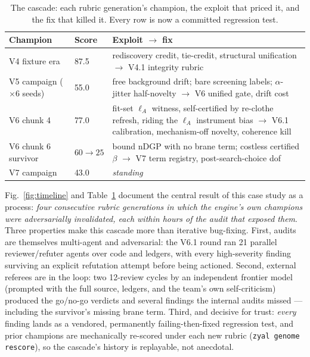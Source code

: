 \documentclass[journal]{IEEEtran}
\newcommand{\lA}{\ell_A}
\begin{document}
\begin{table}[t]
\caption{The cascade: each rubric generation's champion, the exploit that priced it, and
the fix that killed it. Every row is now a committed regression test.}
\label{tab:cascade}
\centering\footnotesize
\begin{tabular}{@{}llp{3.6cm}@{}}
\toprule
\textbf{Champion} & \textbf{Score} & \textbf{Exploit $\rightarrow$ fix} \\
\midrule
V4 fixture era & 87.5 & rediscovery credit, tie-credit, structural unification
$\rightarrow$ V4.1 integrity rubric \\
V5 campaign ($\times 6$ seeds) & 55.0 & free background drift; bare screening labels;
$\alpha$-jitter half-novelty $\rightarrow$ V6 unified gate, drift cost \\
V6 chunk 4 & 77.0 & fit-set $\lA$ witness, self-certified by re-clothe refresh, riding
the $\lA$ instrument bias $\rightarrow$ V6.1 calibration, mechanism-off novelty,
coherence kill \\
V6 chunk 6 survivor & $60 \to 25$ & bound nDGP with no brane term; costless certified
$\beta$ $\rightarrow$ V7 term registry, post-search-choice dof \\
V7 campaign & 43.0 & \emph{standing} \\
\bottomrule
\end{tabular}
\end{table}

Fig.~\ref{fig:timeline} and Table~\ref{tab:cascade} document the central result of this
case study as a process: \emph{four consecutive rubric generations in which the
engine's own champions were adversarially invalidated, each within hours of the audit
that exposed them}. Three properties make this cascade more than iterative bug-fixing.
First, audits are themselves multi-agent and adversarial: the V6.1 round ran 21
parallel reviewer/refuter agents over code and ledgers, with every high-severity finding
surviving an explicit refutation attempt before being actioned. Second, external
referees are in the loop: two 12-review cycles by an independent frontier model
(prompted with the full source, ledgers, and the team's own self-criticism) produced the
go/no-go verdicts and several findings the internal audits missed --- including the
survivor's missing brane term. Third, and decisive for trust: \emph{every} finding lands
as a vendored, permanently failing-then-fixed regression test, and prior champions are
mechanically re-scored under each new rubric (\texttt{zyal genome rescore}), so the
cascade's history is replayable, not anecdotal.
\end{document}
